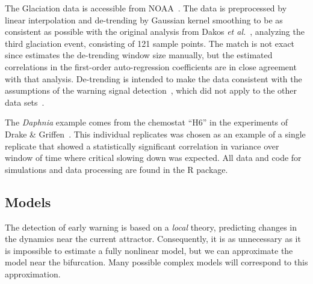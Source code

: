 \documentclass[authoryear,preprint,11pt]{elsarticle}
\begin{document}
The Glaciation data is accessible from NOAA~\citep{Petit1999}.
The data is preprocessed by linear interpolation and de-trending by Gaussian kernel smoothing 
to be as consistent as possible with the original analysis from Dakos \emph{et al.}~\citep{Dakos2008},
analyzing the third glaciation event, consisting of 121 sample points. 
The match is not exact since estimates the de-trending window size manually,
but the estimated correlations in the first-order auto-regression coefficients are in close agreement with that analysis. 
De-trending is intended to make the data consistent with the assumptions of the warning signal detection~\citep{Dakos2008}, 
which did not apply to the other data sets~\citep{Drake2010}.  

The \emph{Daphnia} example comes from the chemostat ``H6'' in the experiments of Drake \& Griffen~\citep{Drake2010}. 
This individual replicates was chosen as an example of a single replicate 
that showed a statistically significant correlation in variance over window of time where critical slowing down was expected.  All data and code for simulations and data processing are found in the R package.  


\subsection{Models}
The detection of early warning is based on a \emph{local} theory,
predicting changes in the dynamics near the current attractor.
Consequently, it is as unnecessary as it is impossible to estimate a fully nonlinear model,
but we can approximate the model near the bifurcation.  
Many possible complex models will correspond to this approximation.
\end{document}
